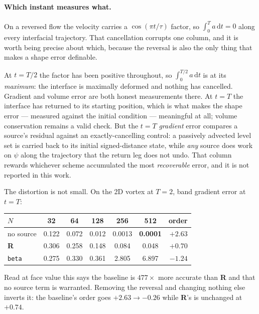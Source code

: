 \documentclass[preprint,3p,11pt]{elsarticle}
\newcommand{\psilev}{\psi}
\begin{document}
\paragraph{Which instant measures what.}
\label{par:reversal}
On a reversed flow the velocity carries a $\cos(\pi t/\tau)$ factor, so
$\int_0^T a\,\mathrm dt = 0$ along every interfacial trajectory. That
cancellation corrupts one column, and it is worth being precise about which,
because the reversal is also the only thing that makes a shape error definable.

At $t=T/2$ the factor has been positive throughout, so $\int_0^{T/2} a\,\mathrm dt$
is at its \emph{maximum}: the interface is maximally deformed and nothing has
cancelled. Gradient and volume error are both honest measurements there. At
$t=T$ the interface has returned to its starting position, which is what makes
the shape error --- measured against the initial condition --- meaningful at
all; volume conservation remains a valid check. But the $t=T$ \emph{gradient}
error compares a source's residual against an exactly-cancelling control: a
passively advected level set is carried back to its initial signed-distance
state, while \emph{any} source does work on $\psilev$ along the trajectory that
the return leg does not undo. That column rewards whichever scheme accumulated
the most \emph{recoverable} error, and it is not reported in this work.

The distortion is not small. On the 2D vortex at $T=2$, band gradient error at
$t=T$:
\begin{center}
\begin{tabular}{lcccccr}
\toprule
$N$ & 32 & 64 & 128 & 256 & 512 & order \\
\midrule
no source     & 0.122 & 0.072 & 0.012 & 0.0013 & \textbf{0.0001} & $+2.63$ \\
\textbf{R}    & 0.306 & 0.258 & 0.148 & 0.084  & 0.048           & $+0.70$ \\
\texttt{beta} & 0.275 & 0.330 & 0.361 & 2.805  & 6.897           & $-1.24$ \\
\bottomrule
\end{tabular}
\end{center}
Read at face value this says the baseline is $477\times$ more accurate than
\textbf{R} and that no source term is warranted. Removing the reversal and
changing nothing else inverts it: the baseline's order goes $+2.63 \to -0.26$
while \textbf{R}'s is unchanged at $+0.74$.
\end{document}
